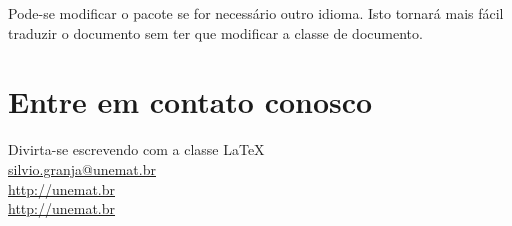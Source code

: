 \documentclass[12pt,a4paper,oneside,linenumbers=off,latinmodern=off,timesnews=off,spanish,english,portuges]{rctart-class/rctart}
\begin{document}
        Pode-se modificar o pacote  se for necessário outro idioma. Isto tornará mais fácil traduzir o documento sem ter que modificar a classe de documento.
    
    
        
        
\section*{Entre em contato conosco}

    Divirta-se escrevendo com a classe  \LaTeX\   \hspace{5pt}\faHandSpock[regular] \\%
    \faEnvelope[regular]\hspace{7pt}\href{mailto://silvio.granja@unemat.br}{silvio.granja@unemat.br}\\
    \faUniversity\hspace{7pt}\href{http://unemat.br}{http://unemat.br}\\
    \faMapMarked\hspace{7pt}\href{https://maps.app.goo.gl/d1oovfssBBWaKnRk6}{http://unemat.br}




\end{document}
